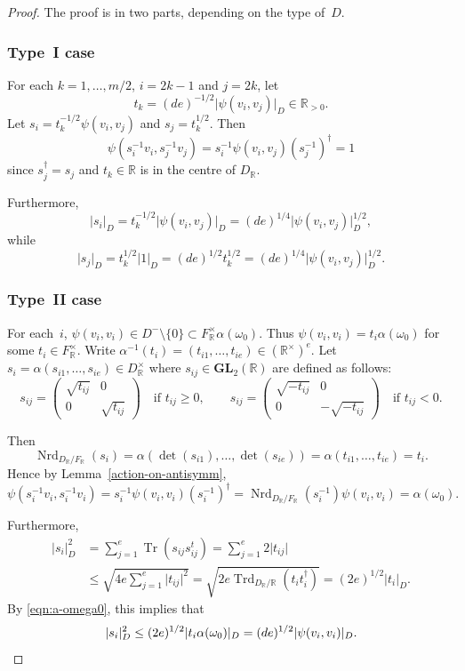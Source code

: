 \documentclass[JEP,XML,SOM,Unicode,NoFloatCountersInSection]{cedram}
\newcommand{\bR}{\mathbb{R}}
\newcommand{\gGL}{\mathbf{GL}}
\DeclareMathOperator{\Nrd}{Nrd}
\DeclareMathOperator{\Tr}{Tr}
\DeclareMathOperator{\Trd}{Trd}
\newcommand{\abs}[1]{\lvert #1 \rvert}
\newcommand{\fullmatrix}[4]{\left( \begin{matrix} #1 & #2 \\ #3 & #4 \end{matrix} \right)}
\begin{document}
\begin{proof}
The proof is in two parts, depending on the type of~$D$.

\subsubsection*{Type~I case}
For each $k = 1, \dotsc, m/2$, $i=2k-1$ and $j=2k$, let
\[
t_k = (de)^{-1/2} \abs{\psi(v_i, v_j)}_D \in \bR_{>0}.
\]
Let $s_i = t_k^{-1/2} \psi(v_i, v_j)$ and $s_j = t_k^{1/2}$.
Then
\[
\psi(s_i^{-1} v_i, s_j^{-1} v_j) = s_i^{-1} \psi(v_i, v_j) (s_j^{-1})^\dag = 1
\]
since $s_j^\dag = s_j$ and $t_k \in \bR$ is in the centre of $D_\bR$.

Furthermore,
\[
\abs{s_i}_D = t_k^{-1/2} \abs{\psi(v_i, v_j)}_D = (de)^{1/4} \abs{\psi(v_i, v_j)}_D^{1/2},
\]
while
\[
\abs{s_j}_D = t_k^{1/2} \abs{1}_D = (de)^{1/2} t_k^{1/2} = (de)^{1/4} \abs{\psi(v_i, v_j)}_D^{1/2}.
\]

\subsubsection*{Type~II case}
For each~$i$, $\psi(v_i, v_i) \in D^- \setminus\{0\} \subset F_\bR^\times \alpha(\omega_0)$.
Thus $\psi(v_i, v_i) = t_i\alpha(\omega_0)$ for some $t_i \in F_\bR^\times$.
Write $\alpha^{-1}(t_i) = (t_{i1}, \dotsc, t_{ie}) \in (\bR^\times)^e$.
Let $s_i = \alpha(s_{i1}, \dotsc, s_{ie}) \in D_\bR^\times$ where $s_{ij} \in \gGL_2(\bR)$ are defined as follows:
\[
s_{ij} = \fullmatrix{\sqrt{t_{ij}}}{0}{0}{\sqrt{t_{ij}}} \quad\text{if } t_{ij} \geq 0,\qquad
s_{ij} = \fullmatrix{\sqrt{-t_{ij}}}{0}{0}{-\sqrt{-t_{ij}}} \quad\text{if } t_{ij} < 0.
\]

Then
\[
\Nrd_{D_\bR/F_\bR}(s_i) = \alpha(\det(s_{i1}), \dotsc, \det(s_{ie})) = \alpha(t_{i1}, \dotsc, t_{ie}) = t_i.
\]
Hence by Lemma~\ref{action-on-antisymm},
\[
\psi(s_i^{-1} v_i, s_i^{-1} v_i) = s_i^{-1} \psi(v_i, v_i) (s_i^{-1})^\dag = \Nrd_{D_\bR/F_\bR}(s_i^{-1}) \psi(v_i, v_i) = \alpha(\omega_0).
\]

Furthermore,
\begin{align*}
\abs{s_i}_D^2
& = \sum_{j=1}^e \Tr(s_{ij} s_{ij}^t)
= \sum_{j=1}^e 2\abs{t_{ij}}
\\& \leq \sqrt{4e \textstyle\sum_{j=1}^e \abs{t_{ij}}^2}
= \sqrt{2e \Trd_{D_\bR/\bR}(t_i t_i^\dag)}
= (2e)^{1/2} \abs{t_i}_D.
\end{align*}
By \eqref{eqn:a-omega0}, this implies that
\[
\abs{s_i}_D^2 \leq (2e)^{1/2} \abs{t_i\alpha(\omega_0)}_D = (de)^{1/2} \abs{\psi(v_i, v_i)}_D.
\qedhere
\]
\end{proof}
\end{document}
